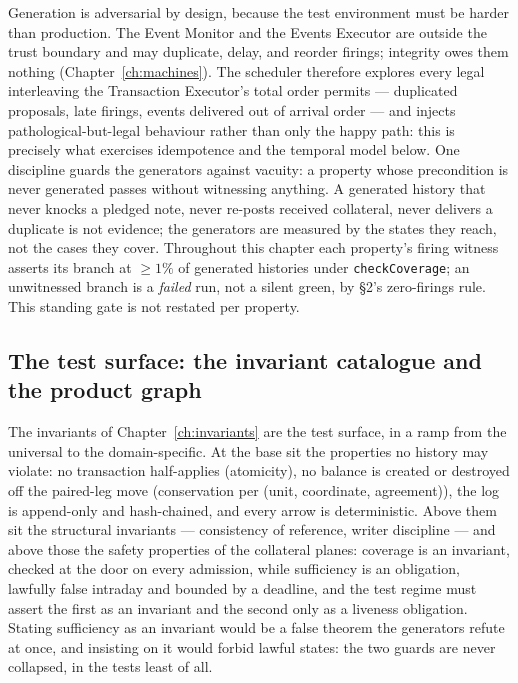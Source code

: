 \documentclass[11pt,a4paper]{article}
\begin{document}
Generation is adversarial by design, because the test environment must be harder than
production. The Event Monitor and the Events Executor are outside the trust boundary and may
duplicate, delay, and reorder firings; integrity owes them nothing
(Chapter~\ref{ch:machines}). The scheduler therefore explores every legal interleaving the
Transaction Executor's total order permits --- duplicated proposals, late firings, events
delivered out of arrival order --- and injects pathological-but-legal behaviour rather than
only the happy path: this is precisely what exercises idempotence and the temporal model
below. One discipline guards the generators against vacuity: a property whose precondition
is never generated passes without witnessing anything. A generated history that never knocks
a pledged note, never re-posts received collateral, never delivers a duplicate is not
evidence; the generators are measured by the states they reach, not the cases they cover.
Throughout this chapter each property's firing witness asserts its branch at $\ge 1\%$ of
generated histories under \texttt{checkCoverage}; an unwitnessed branch is a \emph{failed}
run, not a silent green, by \S 2's zero-firings rule. This standing gate is not restated per
property.

\subsection{The test surface: the invariant catalogue and the product graph}

The invariants of Chapter~\ref{ch:invariants} are the test surface, in a ramp from the
universal to the domain-specific. At the base sit the properties no history may violate: no
transaction half-applies (atomicity), no balance is created or destroyed off the paired-leg
move (conservation per (unit, coordinate, agreement)), the log is append-only and
hash-chained, and every arrow is deterministic. Above them sit the structural invariants --- consistency of
reference, writer discipline --- and above those the safety properties of the collateral
planes: coverage is an invariant, checked at the door on every admission, while sufficiency
is an obligation, lawfully false intraday and bounded by a deadline, and the test regime
must assert the first as an invariant and the second only as a liveness obligation. Stating
sufficiency as an invariant would be a false theorem the generators refute at once, and
insisting on it would forbid lawful states: the two guards are never collapsed, in the tests
least of all.
\end{document}

